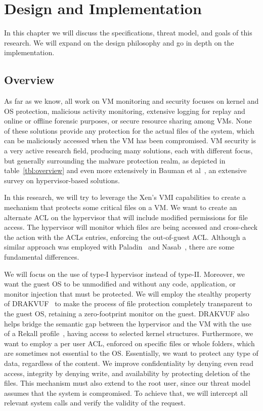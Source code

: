 
\chapter{Design and Implementation}\label{ch:chapter3}

In this chapter we will discuss the specifications, threat model, and goals of this research. We will expand on the design philosophy and go in depth on the implementation.

\section{Overview}

As far as we know, all work on \ac{VM} monitoring and security focuses on kernel and \ac{OS} protection, malicious activity monitoring, extensive logging for replay and online or offline forensic purposes, or secure resource sharing among \ac{VM}s. None of these solutions provide any protection for the actual files of the system, which can be maliciously accessed when the \ac{VM} has been compromised. \ac{VM} security is a very active research field, producing many solutions, each with different focus, but generally surrounding the malware protection realm, as depicted in table~\ref{tbl:overview} and even more extensively in Bauman et al~\cite{bauman2015survey}, an extensive survey on hypervisor-based solutions.

\par In this research, we will try to leverage the Xen’s \ac{VMI} capabilities to create a mechanism that protects some critical files on a \ac{VM}. We want to create an alternate \ac{ACL} on the hypervisor that will include modified permissions for file access. The hypervisor will monitor which files are being accessed and cross-check the action with the \ac{ACL}s entries, enforcing the out-of-guest \ac{ACL}. Although a similar approach was employed with Paladin~\cite{baliga2008automated} and Nasab~\cite{nasab2012security}, there are some fundamental differences. 

\par We will focus on the use of type-I hypervisor instead of type-II. Moreover, we want the guest \ac{OS} to be unmodified and without any code, application, or monitor injection that must be protected. We will employ the stealthy property of DRAKVUF~\cite{lengyel2014drakvuf} to make the process of file protection completely transparent to the guest \ac{OS}, retaining a zero-footprint monitor on the guest. DRAKVUF also helps bridge the semantic gap between the hypervisor and the \ac{VM} with the use of a Rekall profile~\cite{rekall}, having access to selected kernel structures. Furthermore, we want to employ a per user \ac{ACL}, enforced on specific files or whole folders, which are sometimes not essential to the \ac{OS}. Essentially, we want to protect any type of data, regardless of the content. We improve confidentiality by denying even read access, integrity by denying write, and availability by protecting deletion of the files. This mechanism must also extend to the root user, since our threat model assumes that the system is compromised. To achieve that, we will intercept all relevant system calls and verify the validity of the request. 

